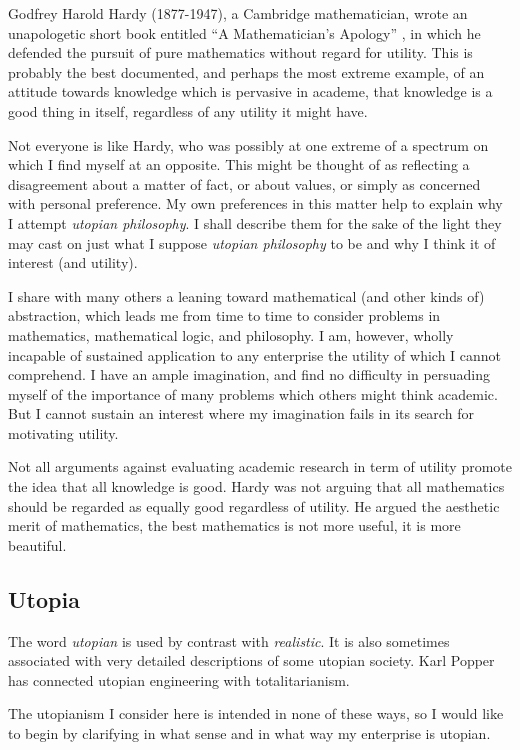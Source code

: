 Godfrey Harold Hardy (1877-1947), a Cambridge mathematician, wrote an unapologetic short book entitled ``A Mathematician's Apology''  \cite{hardyMA}, in which he defended the pursuit of pure mathematics without regard for utility.
This is probably the best documented, and perhaps the most extreme example, of an attitude towards knowledge which is pervasive in academe, that knowledge is a good thing in itself, regardless of any utility it might have.

Not everyone is like Hardy, who was possibly at one extreme of a spectrum on which I find myself at an opposite.
This might be thought of as reflecting a disagreement about a matter of fact, or about values, or simply as concerned with personal preference.
My own preferences in this matter help to explain why I attempt {\it utopian philosophy}.
I shall describe them for the sake of the light they may cast on just what I suppose {\it utopian philosophy} to be and why I think it of interest (and utility).

I share with many others a leaning toward mathematical (and other kinds of) abstraction, which leads me from time to time to consider problems in mathematics, mathematical logic, and philosophy. 
I am, however, wholly incapable of sustained application to any enterprise the utility of which I cannot comprehend.
I have an ample imagination, and find no difficulty in persuading myself of the importance of many problems which others might think academic.
But I cannot sustain an interest where my imagination fails in its search for motivating utility.

Not all arguments against evaluating academic research in term of utility promote the idea that all knowledge is good.
Hardy was not arguing that all mathematics should be regarded as equally good regardless of utility.
He argued the aesthetic merit of mathematics, the best mathematics is not more useful, it is more beautiful.

\subsection{Utopia}

The word {\it utopian} is used by contrast with {\it realistic}.
It is also sometimes associated with very detailed descriptions of some utopian society.
Karl Popper has connected utopian engineering with totalitarianism.

The utopianism I consider here is intended in none of these ways, so I would like to begin by clarifying in what sense and in what way my enterprise is utopian.


